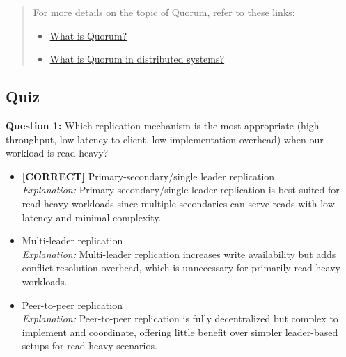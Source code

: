 \begin{quote}
For more details on the topic of Quorum, refer to these links:

\begin{itemize}
\item
\href{https://www.educative.io/answers/what-is-a-quorum}{What is Quorum?}
\item
\href{https://www.educative.io/answers/what-is-quorum-in-distributed-systems}{What is Quorum in distributed systems?}
\end{itemize}
\end{quote}

\subsection*{Quiz}
\vspace{0.3cm}
\noindent
\textbf{Question 1:} Which replication mechanism is the most appropriate (high throughput, low latency to client, low implementation overhead) when our workload is read-heavy?
\\[0.2cm]
\begin{itemize}
 \item \textbf{[CORRECT]} Primary-secondary/single leader replication
\\[0.1cm]
\textit{Explanation:} 
Primary-secondary/single leader replication is best suited for read-heavy workloads since multiple secondaries can serve reads with low latency and minimal complexity.
 \item Multi-leader replication
\\[0.1cm]
\textit{Explanation:} 
Multi-leader replication increases write availability but adds conflict resolution overhead, which is unnecessary for primarily read-heavy workloads.
 \item Peer-to-peer replication
\\[0.1cm]
\textit{Explanation:} 
Peer-to-peer replication is fully decentralized but complex to implement and coordinate, offering little benefit over simpler leader-based setups for read-heavy scenarios.
\end{itemize}

